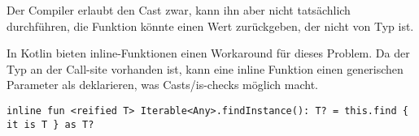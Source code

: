 Der Compiler erlaubt den Cast zwar, kann ihn aber nicht tatsächlich durchführen, \dah die Funktion könnte einen Wert
zurückgeben, der nicht von Typ  ist.

In Kotlin bieten inline-Funktionen einen Workaround für dieses Problem.
Da der Typ an der Call-site vorhanden ist, kann eine inline Funktion einen generischen Parameter als
 deklarieren, was Casts/is-checks möglich macht.\cite{kdocInline}

\begin{verbatim}
inline fun <reified T> Iterable<Any>.findInstance(): T? = this.find { it is T } as T?
\end{verbatim}

\renewcommand{\kapitelautor}{}
